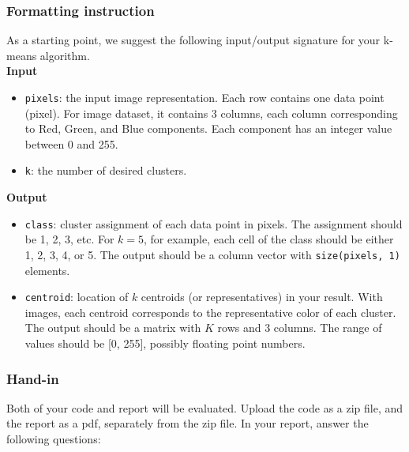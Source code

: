 \documentclass[twoside,10pt]{article}
\begin{document}
\subsubsection*{Formatting instruction}

As a starting point, we suggest the following input/output signature for your k-means algorithm.\\

\textbf{Input}
\begin{itemize}
  \item \texttt{pixels}: the input image representation. Each row contains one data point (pixel). For image dataset, it contains 3 columns, each column corresponding to Red, Green, and Blue components. Each component has an integer value between 0 and 255.
  \item \texttt{k}: the number of desired clusters.
\end{itemize}

\textbf{Output}
\begin{itemize}
  \item \texttt{class}: cluster assignment of each data point in pixels. The assignment should be 1, 2, 3, etc. For $k = 5$, for example, each cell of the class should be either 1, 2, 3, 4, or 5. The output should be a column vector with \texttt{size(pixels, 1)} elements.
  \item \texttt{centroid}: location of $k$ centroids (or representatives) in your result. With images, each centroid corresponds to the representative color of each cluster. The output should be a matrix with $K$ rows and 3 columns. The range of values should be [0, 255], possibly floating point numbers.
\end{itemize}

\subsubsection*{Hand-in}
Both of your code and report will be evaluated. Upload the code as a zip file, and the report as a pdf, separately from the zip file. In your report, answer the following questions:
\end{document}
